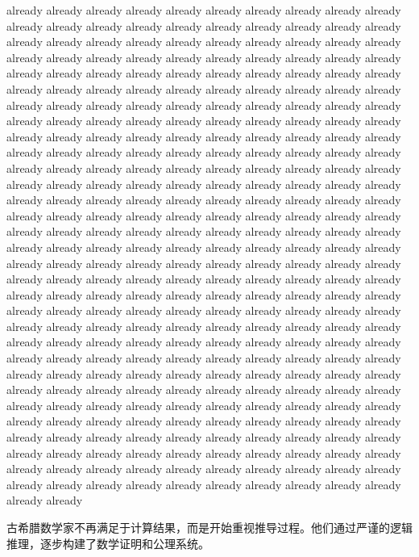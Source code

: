 already already already already already already already already already already already already already already already already already already already already already already already already already already already already already already already already already already already already already already already already already already already already already already already already already already already already already already already already already already already already already already already already already already already already already already already already already already already already already already already already already already already already already already already already already already already already already already already already already already already already already already already already already already already already already already already already already already already already already already already already already already already already already already already already already already already already already already already already already already already already already already already already already already already already already already already already already already already already already already already already already already already already already already already already already already already already already already already already already already already already already already already already already already already already already already already already already already already already already already already already already already already already already already already already already already already already already already already already already already already already already already already already already already already already already already already already already already already already already already already already already already already already already already already already already already already already already already already already already already already already already already already already already already already already already already already already already already already already already already already already already already already already already already already already already already already already already already already already already already already already already already already already already already already already already already already already

古希腊数学家不再满足于计算结果，而是开始重视推导过程。他们通过严谨的逻辑推理，逐步构建了数学证明和公理系统。

